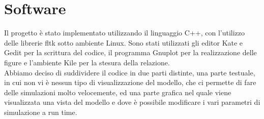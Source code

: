 \documentclass[a4paper,12pt]{article}
\begin{document}
\clearpage
\section{Software}
Il progetto \`e stato implementato utilizzando il linguaggio C++, con l'utilizzo delle librerie fltk sotto ambiente Linux. Sono stati
utilizzati gli editor Kate e Gedit per la scrittura del codice, il programma Gnuplot per la realizzazione delle figure e l'ambiente Kile per
la stesura della relazione.\\
Abbiamo deciso 
di suddividere il codice in due parti distinte, una parte testuale, in cui non vi \`e nessun tipo di visualizzazione del modello, che ci 
permette di fare delle simulazioni molto velocemente, ed una parte grafica nel quale viene visualizzata una vista del modello e dove \`e 
possibile modificare i vari parametri di simulazione a run time.
\end{document}
